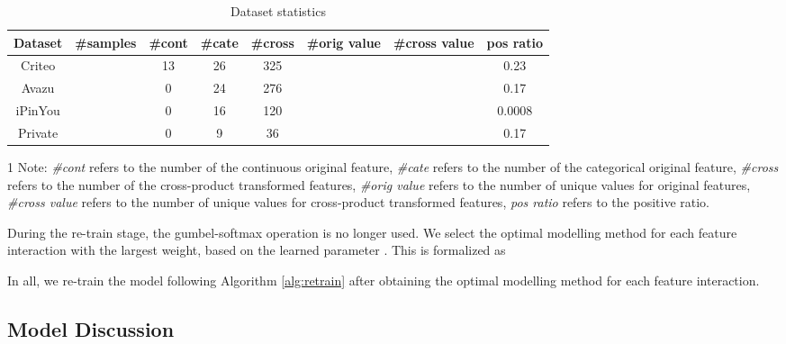 \documentclass[conference]{IEEEtran}
\begin{document}
\begin{table*}[!htbp]
    \renewcommand\arraystretch{1.00}
    \centering
    \caption{Dataset statistics}
    \begin{tabular}{c|ccccccc}
        \hline
        Dataset & \#samples & \#cont & \#cate & \#cross & \#orig value & \#cross value & pos ratio \\
        \hline
        Criteo  &  & 13 & 26 & 325 &  &  & 0.23 \\
        Avazu   &  & 0  & 24 & 276 &  &  & 0.17 \\
        iPinYou &  & 0  & 16 & 120 &  &  & 0.0008 \\
        Private &  & 0  & 9  & 36  &  &  & 0.17 \\
        \hline
    \end{tabular}
    \begin{tablenotes}
    \footnotesize
    \item[1] Note: \textit{\#cont} refers to the number of the continuous original feature, \textit{\#cate} refers to the number of the categorical original feature, \textit{\#cross} refers to the number of the cross-product transformed features, \textit{\#orig value} refers to the number of unique values for original features, \textit{\#cross value} refers to the number of unique values for cross-product transformed features, \textit{pos ratio} refers to the positive ratio. 
    \end{tablenotes}
    \label{Table:dataset}
\end{table*}

During the re-train stage, the gumbel-softmax operation is no longer used. We select the optimal modelling method for each feature interaction with the largest weight, based on the learned parameter . This is formalized as



In all, we re-train the model following Algorithm \ref{alg:retrain} after obtaining the optimal modelling method for each feature interaction. 

\subsection{Model Discussion}
\label{model}
\end{document}
